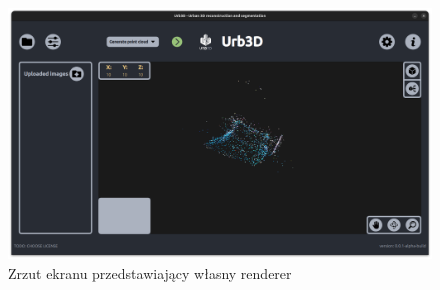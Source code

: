 \begin{figure}[!ht]
    \centering
    \includegraphics[width=\textwidth]{images/UI-Rendering.png}
    \caption{Zrzut ekranu przedstawiający własny renderer}
    \label{fig:rendering}
\end{figure}

